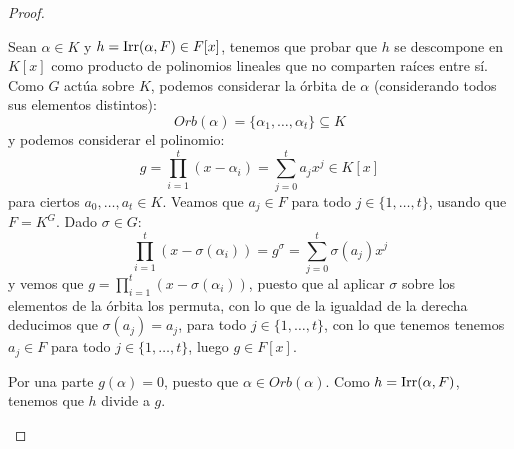 \begin{teo}
\begin{proof}
\begin{description}
                Sean $\alpha\in K$ y $h = \operatorname{Irr}(\alpha,F)\in F[x]$, tenemos que probar que $h$ se descompone en $K[x]$ como producto de polinomios lineales que no comparten raíces entre sí. Como $G$ actúa sobre $K$, podemos considerar la órbita de $\alpha$ (considerando todos sus elementos distintos):
                \begin{equation*}
                    Orb(\alpha) = \{\alpha_1, \ldots, \alpha_t\} \subseteq K
                \end{equation*}
                y podemos considerar el polinomio:
                \begin{equation*}
                    g = \prod_{i=1}^{t}(x-\alpha_i) = \sum_{j=0}^{t} a_j x^j \in K[x]
                \end{equation*}
                para ciertos $a_0,\ldots,a_t \in K$. Veamos que $a_j \in F$ para todo $j\in \{1,\ldots,t\}$, usando que $F=K^G$. Dado $\sigma\in G$:
                \begin{equation*}
                    \prod_{i=1}^{t} (x-\sigma(\alpha_i)) = g^\sigma = \sum_{j=0}^{t} \sigma(a_j) x^j
                \end{equation*}
                y vemos que $g = \prod\limits_{i=1}^{t}(x-\sigma(\alpha_i))$, puesto que al aplicar $\sigma$ sobre los elementos de la órbita los permuta, con lo que de la igualdad de la derecha deducimos que $\sigma(a_j) = a_j$, para todo $j\in \{1,\ldots,t\}$, con lo que tenemos tenemos $a_j\in F$ para todo $j \in \{1,\ldots,t\}$, luego $g\in F[x]$.

                Por una parte $g(\alpha) = 0$, puesto que $\alpha\in Orb(\alpha)$. Como $h=\operatorname{Irr}(\alpha,F)$, tenemos que $h$ divide a $g$.


\end{description}
\end{proof}
\end{teo}
